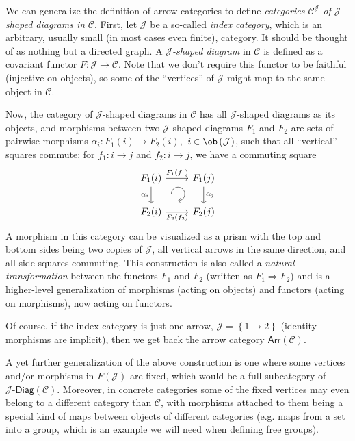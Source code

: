\begin{defn}\label{categories of diagrams}
We can generalize the definition of arrow categories to define \emph{categories
$\mathcal{C}^\mathcal{J}$ of $\mathcal{J}$-shaped
diagrams in} $\mathcal{C}$. First, let $\mathcal{J}$ be a so-called \emph{index
category}, which is an arbitrary, usually small (in most cases even finite), category.
It should be thought of as nothing but a directed graph. A \emph{$\mathcal{J}$-shaped
diagram} in $\mathcal{C}$ is defined as a covariant functor $F:\mathcal{J}\to\mathcal{C}$.
Note that we don't require this functor to be faithful (injective
on objects), so some of the ``vertices'' of $\mathcal{J}$ might
map to the same object in $\mathcal{C}$.

Now, the category of $\mathcal{J}$-shaped diagrams in $\mathcal{C}$
has all $\mathcal{J}$-shaped diagrams as its objects, and morphisms
between two $\mathcal{J}$-shaped diagrams $F_{1}$ and $F_{2}$ are
sets of pairwise morphisms $\alpha_{i}:F_{1}\left(i\right)\to F_{2}\left(i\right),$
$i\in\ob\left(\mathcal{J}\right)$, such that all ``vertical'' squares
commute: for $f_{1}:i\to j$ and $f_{2}:i\to j$, we have a commuting
square
\[\begin{tikzcd}[every matrix/.append style={name=m},   
execute at end picture={\draw [<-] ([xshift=-2.7em,yshift=.3em]m-2-2.north) arc[start angle=-90,delta angle=270,radius=0.25cm];}]
   F_1(i)\arrow[r,"F_1(f_1)" ]\arrow[d,swap,"\alpha_i" ]& F_1(j) \arrow[d,"\alpha_j" ] \\
   F_2(i)\arrow[r,swap,"F_2(f_2)" ]& F_2(j)
\end{tikzcd}\]
A morphism in this category can be visualized as a prism with the
top and bottom sides being two copies of $\mathcal{J}$, all vertical
arrows in the same direction, and all side squares commuting. This
construction is also called a \emph{natural transformation} between
the functors $F_{1}$ and $F_{2}$ (written as $F_{1}\Longrightarrow F_{2}$)
and is a higher-level generalization of morphisms (acting on objects)
and functors (acting on morphisms), now acting on functors.

Of course, if the index category is just one arrow, $\mathcal{J}=\left\{ 1\to2\right\} $
(identity morphisms are implicit), then we get back the arrow category
$\mathsf{Arr}\left(\mathcal{C}\right)$.
\end{defn}
%
\begin{example}
A yet further generalization of the above construction is one where
some vertices and/or morphisms in $F\left(\mathcal{J}\right)$ are
fixed, which would be a full subcategory of $\mathcal{J}\text{-}\mathsf{Diag}\left(\mathcal{C}\right)$.
Moreover, in concrete categories some of the fixed vertices may even
belong to a different category than $\mathcal{C}$, with morphisms
attached to them being a special kind of maps between objects of different
categories (e.g. maps from a set into a group, which is an example
we will need when defining free groups).
\end{example}
